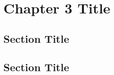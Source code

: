 \documentclass[../main.tex]{subfiles}
\begin{document}
\newpage
\doublespacing
\setcounter{chapter}{2}
\thesischapterstyle
\thispagestyle{empty}

\chapter{Chapter 3 Title}\label{chap3:short-label}

\section{Section Title}
\lipsum[1]

\section{Section Title}
\lipsum[2]
\end{document}
